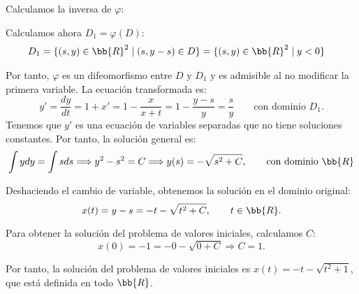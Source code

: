 \documentclass[12pt]{article}
\begin{document}
\begin{ejercicio}
\begin{description}
        Calculamos la inversa de $\varphi$:

        Calculamos ahora $D_1=\varphi(D)$:
        \begin{align*}
            D_1 &= \{(s,y)\in\bb{R}^2\mid (s,y-s)\in D\}
            = \{(s,y)\in\bb{R}^2\mid y<0\}
        \end{align*}

        Por tanto, $\varphi$ es un difeomorfismo entre $D$ y $D_1$ y es admisible al no modificar la primera variable. La ecuación transformada es:
        \begin{equation*}
            y'=\dfrac{dy}{dt}=1+x'=1-\dfrac{x}{x+t}=1-\dfrac{y-s}{y}=\dfrac{s}{y}\qquad \text{con dominio }D_1.
        \end{equation*}
        Tenemos que $y'$ es una ecuación de variables separadas que no tiene soluciones constantes. Por tanto, la solución general es:
        \begin{equation*}
            \int ydy = \int sds \Longrightarrow y^2 - s^2 =C
            \Longrightarrow y(s)=-\sqrt{s^2+C},\qquad \text{con dominio }\bb{R}
        \end{equation*}

        Deshaciendo el cambio de variable, obtenemos la solución en el dominio original:
        \begin{equation*}
            x(t)=y-s=-t-\sqrt{t^2+C},\qquad t\in \bb{R}.
        \end{equation*}

        Para obtener la solución del problema de valores iniciales, calculamos $C$:
        \begin{equation*}
            x(0)=-1=-0-\sqrt{0+C}\Longrightarrow C=1.
        \end{equation*}

        Por tanto, la solución del problema de valores iniciales es $x(t)=-t-\sqrt{t^2+1}$, que está definida en todo $\bb{R}$.
    \end{description}
\end{ejercicio}
\end{document}
